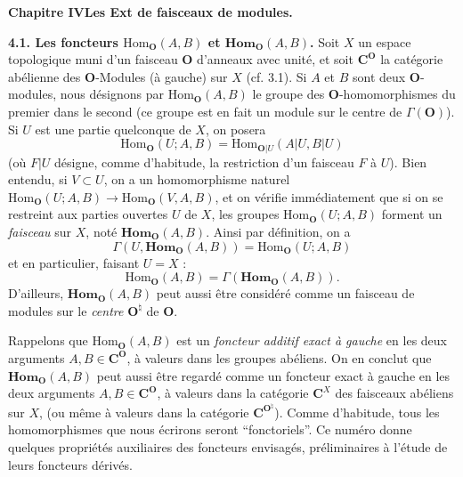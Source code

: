 \clearpage
{}

\begin{center}
{\large\bfseries Chapitre IV\quad Les Ext de faisceaux de modules.}
\end{center}

\textbf{4.1. Les foncteurs $\mathrm{Hom}_\mathbf O(A,B)$ et
$\mathbf{Hom}_\mathbf O(A,B)$.}
Soit $X$ un espace topologique muni d'un faisceau $\mathbf O$ d'anneaux avec unité,
et soit $\mathbf C^\mathbf O$ la catégorie abélienne des $\mathbf O$-Modules (à gauche) sur $X$
(cf. 3.1). Si $A$ et $B$ sont deux $\mathbf O$-modules, nous désignons par
$\mathrm{Hom}_\mathbf O(A,B)$ le groupe des $\mathbf O$-homomorphismes du premier dans le
second (ce groupe est en fait un module sur le centre de $\Gamma(\mathbf O)$). Si $U$
est une partie quelconque de $X$, on posera
\[
\mathrm{Hom}_\mathbf O(U;A,B)=\mathrm{Hom}_{\mathbf O|U}(A|U,B|U)
\]
(où $F|U$ désigne, comme d'habitude, la restriction d'un faisceau $F$ à $U$).
Bien entendu, si $V\subset U$, on a un homomorphisme naturel
$\mathrm{Hom}_\mathbf O(U;A,B)\to\mathrm{Hom}_\mathbf O(V,A,B)$, et on vérifie
immédiatement que si on se restreint aux parties ouvertes $U$ de $X$, les
groupes $\mathrm{Hom}_\mathbf O(U;A,B)$ forment un \textit{faisceau} sur $X$, noté
$\mathbf{Hom}_\mathbf O(A,B)$. Ainsi par définition, on a
\[
\tag{4.1.1}
\Gamma(U,\mathbf{Hom}_\mathbf O(A,B))=\mathrm{Hom}_\mathbf O(U;A,B)
\]
et en particulier, faisant $U=X$ :
\[
\tag{4.1.2}
\mathrm{Hom}_\mathbf O(A,B)=\Gamma(\mathbf{Hom}_\mathbf O(A,B)).
\]
D'ailleurs, $\mathbf{Hom}_\mathbf O(A,B)$ peut aussi être considéré comme un faisceau
de modules sur le \textit{centre} $\mathbf O^\natural$ de $\mathbf O$.

Rappelons que $\mathrm{Hom}_\mathbf O(A,B)$ est un \textit{foncteur additif exact à
gauche} en les deux arguments $A,B\in \mathbf C^\mathbf O$, à valeurs dans les groupes
abéliens. On en conclut que $\mathbf{Hom}_\mathbf O(A,B)$ peut aussi être regardé comme
un foncteur exact à gauche en les deux arguments $A,B\in \mathbf C^\mathbf O$, à valeurs dans
la catégorie $\mathbf C^X$ des faisceaux abéliens sur $X$, (ou même à valeurs dans la
catégorie $\mathbf C^{\mathbf O^\natural}$). Comme d'habitude, tous les homomorphismes que nous
écrirons seront ``fonctoriels''. Ce numéro donne quelques propriétés
auxiliaires des foncteurs envisagés, préliminaires à l'étude de leurs foncteurs
dérivés.

